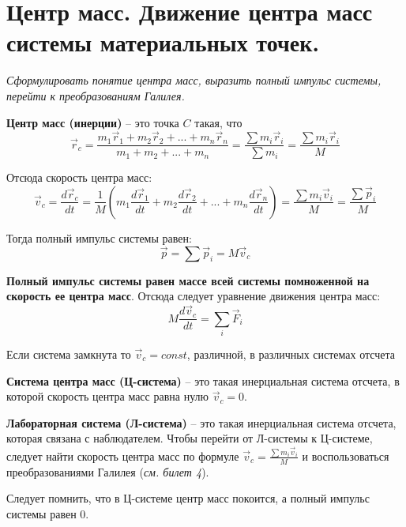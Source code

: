 \documentclass{article}
\begin{document}
   \section{Центр масс. Движение центра масс системы материальных точек.}
    \par
      \textit{Сформулировать понятие центра масс, выразить полный импульс системы, перейти к преобразованиям Галилея.}\\
    \par      
      \textbf{Центр масс (инерции)} -- это точка $C$ такая, что
      \begin{equation}
	\vec r_c=\frac{m_1\vec r_1+m_2\vec r_2+...+m_n\vec r_n}{m_1+m_2+...+m_n}=\frac{\sum m_i\vec r_i}{\sum m_i}=\frac{\sum m_i\vec r_i}{M}
      \end{equation}
    \par
      Отсюда скорость центра масс:
      \begin{equation}
	\vec v_c=\frac{d\vec r_c}{dt}=\frac{1}{M}(m_1\frac{d\vec r_1}{dt}+m_2\frac{d\vec r_2}{dt}+...+m_n\frac{d\vec r_n}{dt})=\frac{\sum m_i\vec v_i}{M}=\frac{\sum \vec p_i}{M}
      \end{equation}
    \par
      Тогда полный импульс системы равен:
      \begin{equation}
	\vec p=\sum\vec p_i=M\vec v_c
      \end{equation}
    \par
      \textbf{Полный импульс системы равен массе всей системы помноженной на скорость ее центра масс}. Отсюда следует уравнение движения центра масс:
      \begin{equation}
	M\frac{d\vec v_c}{dt}=\sum_{i}\vec F_i
      \end{equation}
    \par
      Если система замкнута то $\vec v_c=const$, различной, в различных системах отсчета
    \par
      \textbf{Система центра масс (Ц-система)} -- это такая инерциальная система отсчета, в которой скорость центра масс равна нулю $\vec v_c=0$.
    \par  
      \textbf{Лабораторная система (Л-система)} -- это такая инерциальная система отсчета, которая связана с наблюдателем.
      Чтобы перейти от Л-системы к Ц-системе, следует найти скорость центра масс по формуле $\vec v_c=\frac{\sum m_i\vec v_i}{M}$ и воспользоваться преобразованиями Галилея (\textit{см. билет 4}).
    \par
      Следует помнить, что в Ц-системе центр масс покоится, а полный импульс системы равен 0.
  \clearpage
  
\end{document}

